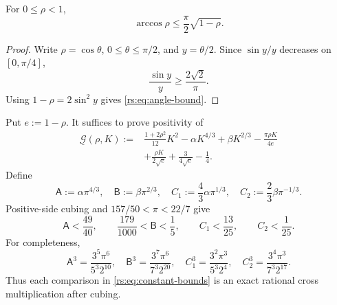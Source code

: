 \begin{lemma}
\label{rs:lem:angle}
For $0\leq\rho<1$,
\begin{equation}
 \arccos\rho\leq\frac\pi2\sqrt{1-\rho}.
 \label{rs:eq:angle-bound}
\end{equation}
\end{lemma}

\begin{proof}
Write $\rho=\cos\theta$, $0\leq\theta\leq\pi/2$, and
$y=\theta/2$.  Since $\sin y/y$ decreases on $[0,\pi/4]$,
\[
 \frac{\sin y}{y}\geq\frac{2\sqrt2}{\pi}.
\]
Using $1-\rho=2\sin^2y$ gives \eqref{rs:eq:angle-bound}.
\end{proof}

Put $e:=1-\rho$.  It suffices to prove positivity of
\begin{equation}
 \begin{aligned}
 \underline{\mathcal G}(\rho,K):={}&
 \frac{1+2\rho^2}{12}K^2
 -\alpha K^{4/3}+\beta K^{2/3}
 -\frac{\pi\rho K}{4e}\\
 &+\frac{\rho K}{2\sqrt e}
 +\frac3{4\sqrt e}-\frac14.
 \end{aligned}
 \label{rs:eq:G-under}
\end{equation}
Define
\begin{equation}
 \mathsf A:=\alpha\pi^{4/3},
 \quad \mathsf B:=\beta\pi^{2/3},
 \quad C_1:=\frac43\alpha\pi^{1/3},
 \quad C_2:=\frac23\beta\pi^{-1/3}.
 \label{rs:eq:scaled-constants}
\end{equation}
Positive-side cubing and $157/50<\pi<22/7$ give
\begin{equation}
 \mathsf A<\frac{49}{40},
 \qquad
 \frac{179}{1000}<\mathsf B<\frac15,
 \qquad
 C_1<\frac{13}{25},
 \qquad
 C_2<\frac1{25}.
 \label{rs:eq:constant-bounds}
\end{equation}
For completeness,
\begin{equation}
 \mathsf A^3=\frac{3^5\pi^6}{5^3 2^{10}},
 \quad
 \mathsf B^3=\frac{3^7\pi^6}{7^3 2^{20}},
 \quad
 C_1^3=\frac{3^2\pi^3}{5^3 2^4},
 \quad
 C_2^3=\frac{3^4\pi^3}{7^3 2^{17}}.
 \label{rs:eq:constant-cubes}
\end{equation}
Thus each comparison in \eqref{rs:eq:constant-bounds} is an exact rational
cross multiplication after cubing.

